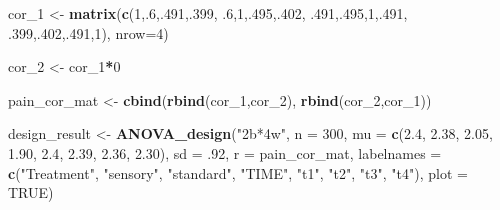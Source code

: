 \documentclass[]{book}
\newenvironment{Shaded}{\begin{snugshade}}{\end{snugshade}}
\newcommand{\DataTypeTok}[1]{\textcolor[rgb]{0.13,0.29,0.53}{#1}}
\newcommand{\DecValTok}[1]{\textcolor[rgb]{0.00,0.00,0.81}{#1}}
\newcommand{\FloatTok}[1]{\textcolor[rgb]{0.00,0.00,0.81}{#1}}
\newcommand{\KeywordTok}[1]{\textcolor[rgb]{0.13,0.29,0.53}{\textbf{#1}}}
\newcommand{\NormalTok}[1]{#1}
\newcommand{\OperatorTok}[1]{\textcolor[rgb]{0.81,0.36,0.00}{\textbf{#1}}}
\newcommand{\OtherTok}[1]{\textcolor[rgb]{0.56,0.35,0.01}{#1}}
\newcommand{\StringTok}[1]{\textcolor[rgb]{0.31,0.60,0.02}{#1}}
\begin{document}
\begin{Shaded}
\begin{Highlighting}[]
\NormalTok{cor_}\DecValTok{1}\NormalTok{ <-}\StringTok{ }\KeywordTok{matrix}\NormalTok{(}\KeywordTok{c}\NormalTok{(}\DecValTok{1}\NormalTok{,.}\DecValTok{6}\NormalTok{,.}\DecValTok{491}\NormalTok{,.}\DecValTok{399}\NormalTok{,}
                  \FloatTok{.6}\NormalTok{,}\DecValTok{1}\NormalTok{,.}\DecValTok{495}\NormalTok{,.}\DecValTok{402}\NormalTok{,}
                  \FloatTok{.491}\NormalTok{,.}\DecValTok{495}\NormalTok{,}\DecValTok{1}\NormalTok{,.}\DecValTok{491}\NormalTok{,}
                  \FloatTok{.399}\NormalTok{,.}\DecValTok{402}\NormalTok{,.}\DecValTok{491}\NormalTok{,}\DecValTok{1}\NormalTok{), }\DataTypeTok{nrow=}\DecValTok{4}\NormalTok{)}

\NormalTok{cor_}\DecValTok{2}\NormalTok{ <-}\StringTok{ }\NormalTok{cor_}\DecValTok{1}\OperatorTok{*}\DecValTok{0}

\NormalTok{pain_cor_mat <-}\StringTok{ }\KeywordTok{cbind}\NormalTok{(}\KeywordTok{rbind}\NormalTok{(cor_}\DecValTok{1}\NormalTok{,cor_}\DecValTok{2}\NormalTok{),}
                      \KeywordTok{rbind}\NormalTok{(cor_}\DecValTok{2}\NormalTok{,cor_}\DecValTok{1}\NormalTok{))}

\NormalTok{design_result <-}\StringTok{ }\KeywordTok{ANOVA_design}\NormalTok{(}\StringTok{"2b*4w"}\NormalTok{,}
                              \DataTypeTok{n =} \DecValTok{300}\NormalTok{,}
                              \DataTypeTok{mu =} \KeywordTok{c}\NormalTok{(}\FloatTok{2.4}\NormalTok{, }\FloatTok{2.38}\NormalTok{, }\FloatTok{2.05}\NormalTok{, }\FloatTok{1.90}\NormalTok{,}
                                     \FloatTok{2.4}\NormalTok{, }\FloatTok{2.39}\NormalTok{, }\FloatTok{2.36}\NormalTok{, }\FloatTok{2.30}\NormalTok{),}
                              \DataTypeTok{sd =} \FloatTok{.92}\NormalTok{,}
                              \DataTypeTok{r =}\NormalTok{ pain_cor_mat,}
                              \DataTypeTok{labelnames =} \KeywordTok{c}\NormalTok{(}\StringTok{"Treatment"}\NormalTok{, }\StringTok{"sensory"}\NormalTok{, }\StringTok{"standard"}\NormalTok{,}
                                             \StringTok{"TIME"}\NormalTok{, }\StringTok{"t1"}\NormalTok{, }\StringTok{"t2"}\NormalTok{, }\StringTok{"t3"}\NormalTok{, }\StringTok{"t4"}\NormalTok{),}
                              \DataTypeTok{plot =} \OtherTok{TRUE}\NormalTok{)}
\end{Highlighting}
\end{Shaded}
\end{document}
